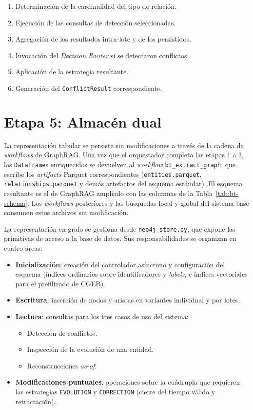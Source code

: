 \begin{enumerate}
  \item Determinación de la cardinalidad del tipo de relación.
  \item Ejecución de las consultas de detección seleccionadas.
  \item Agregación de los resultados intra-lote y de los persistidos.
  \item Invocación del \emph{Decision Router} si se detectaron conflictos.
  \item Aplicación de la estrategia resultante.
  \item Generación del \texttt{ConflictResult} correspondiente.
\end{enumerate}

\section{Etapa 5: Almacén dual}\label{sec:impl-dual-store}

La representación tabular se persiste sin modificaciones a través de la cadena de \emph{workflows} de GraphRAG. Una vez que el orquestador completa las etapas 1 a 3, los \texttt{DataFrame}s enriquecidos se devuelven al \emph{workflow} \texttt{bt\_extract\_graph}, que escribe los \emph{artifacts} Parquet correspondientes (\texttt{entities.parquet}, \texttt{relationships.parquet} y demás artefactos del esquema estándar). El esquema resultante es el de GraphRAG ampliado con las columnas de la Tabla~\ref{tab:bt-schema}. Los \emph{workflows} posteriores y las búsquedas local y global del sistema base consumen estos archivos sin modificación.

La representación en grafo se gestiona desde \texttt{neo4j\_store.py}, que expone las primitivas de acceso a la base de datos. Sus responsabilidades se organizan en cuatro áreas:

\begin{itemize}
  \item \textbf{Inicialización}: creación del controlador asíncrono y configuración del esquema (índices ordinarios sobre identificadores y \emph{labels}, e índices vectoriales para el prefiltrado de CGER).
  \item \textbf{Escritura}: inserción de nodos y aristas en variantes individual y por lotes.
  \item \textbf{Lectura}: consultas para los tres casos de uso del sistema:
    \begin{itemize}
      \item Detección de conflictos.
      \item Inspección de la evolución de una entidad.
      \item Reconstrucciones \emph{as-of}.
    \end{itemize}
  \item \textbf{Modificaciones puntuales}: operaciones sobre la cuádrupla que requieren las estrategias \texttt{EVOLUTION} y \texttt{CORRECTION} (cierre del tiempo válido y retractación).
\end{itemize}

